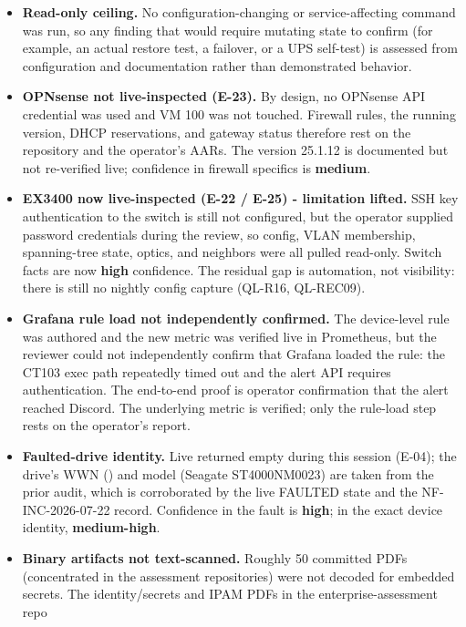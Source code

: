 \begin{itemize}
  \item \textbf{Read-only ceiling.} No configuration-changing or service-affecting
  command was run, so any finding that would require mutating state to confirm (for
  example, an actual restore test, a failover, or a UPS self-test) is assessed from
  configuration and documentation rather than demonstrated behavior.
  \item \textbf{OPNsense not live-inspected (E-23).} By design, no OPNsense API
  credential was used and VM 100 was not touched. Firewall rules, the running
  version, DHCP reservations, and gateway status therefore rest on the repository
  and the operator's AARs. The version 25.1.12 is documented but not re-verified
  live; confidence in firewall specifics is \textbf{medium}.
  \item \textbf{EX3400 now live-inspected (E-22 / E-25) - limitation lifted.} SSH key
  authentication to the switch is still not configured, but the operator supplied
  password credentials during the review, so config, VLAN membership, spanning-tree
  state, optics, and neighbors were all pulled read-only. Switch facts are now
  \textbf{high} confidence. The residual gap is automation, not visibility: there is
  still no nightly config capture (QL-R16, QL-REC09).
  \item \textbf{Grafana rule load not independently confirmed.} The device-level
   rule was authored and the new metric was verified live in
  Prometheus, but the reviewer could not independently confirm that Grafana loaded the
  rule: the CT103 exec path repeatedly timed out and the alert API requires
  authentication. The end-to-end proof is operator confirmation that the alert reached
  Discord. The underlying metric is verified; only the rule-load step rests on the
  operator's report.
  \item \textbf{Faulted-drive identity.} Live  returned
  empty during this session (E-04); the drive's WWN () and
  model (Seagate ST4000NM0023) are taken from the prior audit, which is corroborated
  by the live FAULTED state and the NF-INC-2026-07-22 record. Confidence in the
  fault is \textbf{high}; in the exact device identity, \textbf{medium-high}.
  \item \textbf{Binary artifacts not text-scanned.} Roughly 50 committed PDFs
  (concentrated in the assessment repositories) were not decoded for embedded
  secrets. The identity/secrets and IPAM PDFs in the enterprise-assessment repo

\end{itemize}
